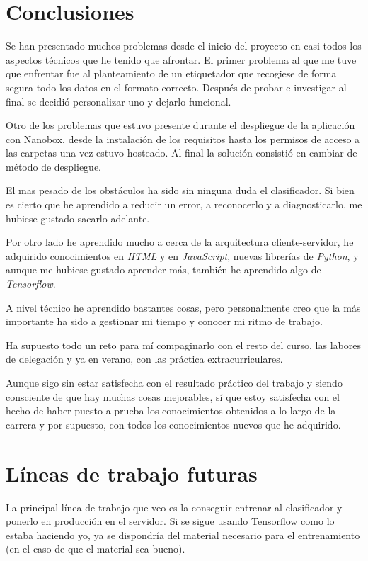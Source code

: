 
\section{Conclusiones}
Se han presentado muchos problemas desde el inicio del proyecto en casi todos los aspectos técnicos que he tenido que afrontar.
El primer problema al que me tuve que enfrentar fue al planteamiento de un etiquetador que recogiese de forma segura todo los datos en el formato correcto. Después de probar e investigar al final se decidió personalizar uno y dejarlo funcional.

Otro de los problemas que estuvo presente durante el despliegue de la aplicación con Nanobox, desde la instalación de los requisitos hasta los permisos de acceso a las carpetas una vez estuvo hosteado. Al final la solución consistió en cambiar de método de despliegue.

El mas pesado de los obstáculos ha sido sin ninguna duda el clasificador. Si bien es cierto que he aprendido a reducir un error, a reconocerlo y a diagnosticarlo, me hubiese gustado sacarlo adelante.

Por otro lado he aprendido mucho a cerca de la arquitectura cliente-servidor, he adquirido conocimientos en \textit{HTML} y en \textit{JavaScript}, nuevas librerías de \textit{Python}, y aunque me hubiese gustado aprender más, también he aprendido algo de \textit{Tensorflow}.

A nivel técnico he aprendido bastantes cosas, pero personalmente creo que la más importante ha sido a gestionar mi tiempo y conocer mi ritmo de trabajo.

Ha supuesto todo un reto para mí compaginarlo con el resto del curso, las labores de delegación y ya en verano, con las práctica extracurriculares. 

Aunque sigo sin estar satisfecha con el resultado práctico del trabajo y siendo consciente de que hay muchas cosas mejorables, sí que estoy satisfecha con el hecho de haber puesto a prueba los conocimientos obtenidos a lo largo de la carrera y por supuesto, con todos los conocimientos nuevos que he adquirido.


\section{Líneas de trabajo futuras}

La principal línea de trabajo que veo es la conseguir entrenar al clasificador y ponerlo en producción en el servidor.
Si se sigue usando Tensorflow como lo estaba haciendo yo, ya se dispondría del material necesario para el entrenamiento (en el caso de que el material sea bueno).

